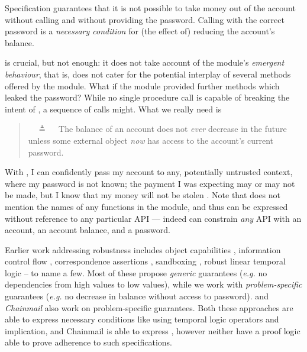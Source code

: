 Specification \SrobustA %
{guarantees} that it is not possible to  take money out of the account 
{without calling  and} without providing the password.
  Calling    with the  correct password is 
a \emph{necessary condition} for {(the effect of)} reducing the account's  balance.

\SrobustA is  crucial, but  not   enough:
it does not take  account of the module's \emph{emergent behaviour},
{that is, does not cater for the potential interplay of several methods offered by the module.}
 What if the module provided further methods which leaked the password?  
{ While no single procedure call is capable of breaking the intent of \SrobustA, a sequence of calls might.}
{What} we really need is
 \begin{quote}
\SrobustB\ \ $\triangleq$ \ \ The balance of an account does not {\emph{ever}} decrease in the future unless some external 
object  {\emph{now}} has access to the account's current password.
\end{quote}
With \SrobustB, I can confidently pass my account to  {any, potentially untrusted context, where my password is not known;} 
 {the payment I was expecting may or may not be made,}
but I know 
 {that my money will not be stolen} \cite{ooToSecurity}. 
 Note that \SrobustB  does not mention
 the names of any functions in the module, and 
 thus can be expressed without reference to any particular API ---
 indeed \SrobustB can constrain \emph{any} API with an account, an account
 balance, and a password.

 
{Earlier work addressing robustness} includes object capabilities  \cite{MillerPhD, dd, threoremsFreeSep}, 
information control flow \cite{Zdancewic:Myers:01,noninteferenceOS}, 
 correspondence assertions \cite{Maffeis:aiamb:thesis00},
 sandboxing  \cite{robustSafetyPatrignani,sandbox},
robust linear temporal logic   \cite{RLTL2022} -- to name a few. %
{Most of these  %
propose \emph{generic}  guarantees (\emph{e.g.} no dependencies from high values to low values),
while we work with  \emph{problem-specific} guarantees  (\emph{e.g.} no decrease in balance without access to password).}
{{{} \cite{VerX} and  \emph{Chainmail} \cite{FASE} also work on problem-specific guarantees.}
Both these approaches are able to express necessary conditions
  like \SrobustA using
  temporal logic operators and implication,
  and Chainmail is able to express \SrobustB,
  however neither have a proof logic
  able to prove adherence to such specifications.}
%






